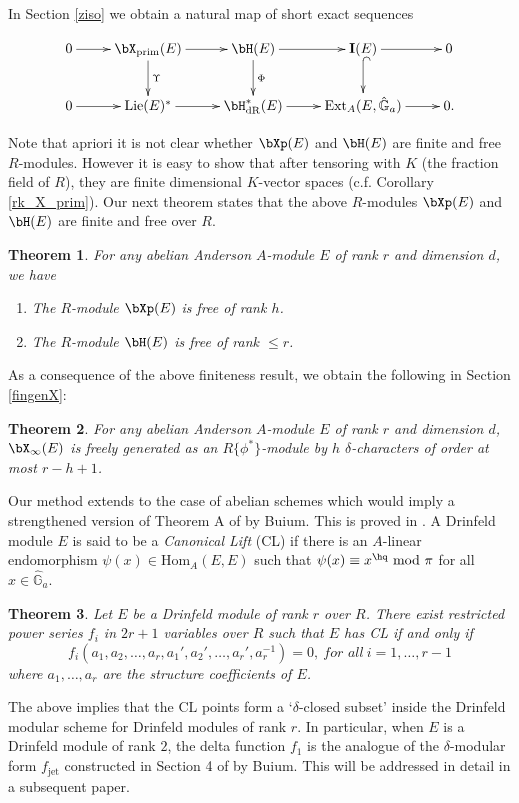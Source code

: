 \documentclass{amsart}
\def \d{\delta}
\newtheorem {theorem} {\bf{Theorem}}[section]
\numberwithin {equation}{section}
\def \d{\delta} \def \bZ{{\mathbb Z}} \def \bV{{\mathcal V}} \def \bF{{\bf F}}
\begin{document}
In Section \ref{ziso} we obtain a natural 
map of short exact sequences

\begin{equation}
	\label{diag-crys-limit-intro}
	\xymatrix{
0  \ar[r] &{\bX}_{\mathrm{prim}}(E)\ar[d]^\Upsilon \ar[r] &{\bH}(E)\ar[d]^\Phi \ar[r] &\mathbf{I}(E)\ar@{^{(}->}[d] \ar[r]&0 \\
0 \ar[r] &\mathrm{Lie} (E)^{*} \ar[r] &\bH^{*}_{\mathrm{dR}}({E}) \ar[r] &\mathrm{Ext}_{A}(E,\hat{\mathbb{G}}_{a}) \ar[r] & 0.}
\end{equation}

Note that apriori it is not clear whether $\bXp(E)$ and $\bH(E)$ are finite 
and free $R$-modules. However it is easy to show that 
after tensoring with $K$ (the fraction field of 
$R$), they are finite dimensional $K$-vector spaces (c.f. Corollary  
\ref{rk_X_prim}). Our next theorem states
that the above $R$-modules $\bXp(E)$ and $\bH(E)$ are finite and 
free over $R$.

\begin{theorem} 
For any abelian Anderson $A$-module $E$ of rank $r$ and dimension $d$,
we have
\begin{enumerate}
\item The $R$-module $\bXp(E)$ is free of rank $h$.
\item The $R$-module ${\bH}(E)$ is free of rank $\leq r$. 
\end{enumerate}
\end{theorem}

As a consequence of the above finiteness result, we obtain the following in
Section \ref{fingenX}:

\begin{theorem}\label{fg_diff_char}
For any abelian Anderson $A$-module $E$ of rank $r$ and dimension $d$, 
${\bX}_{\infty}(E)$  is  freely generated as an
$R\{\phi^{*}\}$-module by $h$ $\d$-characters of order at most $r-h+1$.
\end{theorem}

Our method extends to the case of abelian schemes which would imply
a strengthened version of Theorem A of \cite{Buium 1995} by Buium. This is 
proved in \cite{PS-2}.
A Drinfeld module $E$ is said to be 
a \emph{Canonical Lift} (CL) if there is an $A$-linear endomorphism 
$\psi(x)\in \mathrm{Hom}_A(E,E)$ such that $\psi(x)
\equiv x^\hq ~\mathrm{mod}~\pi$ for all  $x \in \hat{\mathbb{G}}_{a}$. 
\begin{theorem}\label{CL_intro}
Let $E$ be a Drinfeld module of rank $r$ over $R$. There exist
 restricted power series $f_{i}$ in $2r+1$  variables over $R$ such that $E$ has CL if and only if
$$ f_{i}(a_{1},a_{2},\ldots ,a_{r},a_{1}',a_{2}',\ldots ,a_{r}',a_{r}^{-1})=0,\ \textit{for all}\ i=1, \dots , r-1$$ 
where $a_1,\dots, a_r$ are the structure coefficients of $E$.
\end{theorem}
The above implies that
the $\mathrm{CL}$ points form a `$\delta$-closed subset'
 inside the Drinfeld modular scheme for Drinfeld modules of rank $r$.
In particular, when $E$ is a Drinfeld module of rank $2$, the delta function 
$f_{1}$ is the analogue of the $\d$-modular form $f_{\mathrm{jet}}$ 
constructed in Section 4 of \cite{Buium 2000} by Buium. 
This will be addressed in detail in a subsequent paper.
\end{document}
